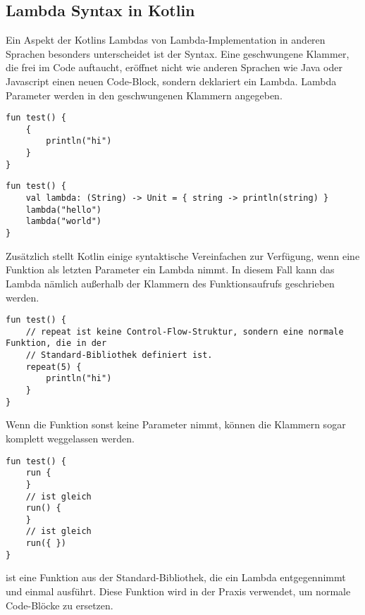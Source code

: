 \subsection{Lambda Syntax in Kotlin}
Ein Aspekt der Kotlins Lambdas von Lambda-Implementation in anderen Sprachen besonders unterscheidet ist der Syntax.
Eine geschwungene Klammer, die frei im Code auftaucht, eröffnet nicht wie anderen Sprachen wie \zB Java oder Javascript
einen neuen Code-Block, sondern deklariert ein Lambda.
Lambda Parameter werden in den geschwungenen Klammern angegeben.\cite{kspecLambdaLiteral}

\begin{verbatim}
fun test() {
    {
        println("hi")
    }
}
\end{verbatim}

\begin{verbatim}
fun test() {
    val lambda: (String) -> Unit = { string -> println(string) }
    lambda("hello")
    lambda("world")
}
\end{verbatim}

Zusätzlich stellt Kotlin einige syntaktische Vereinfachen zur Verfügung, wenn eine Funktion als letzten Parameter
ein Lambda nimmt.
In diesem Fall kann das Lambda nämlich außerhalb der Klammern des Funktionsaufrufs geschrieben werden.

\begin{verbatim}
fun test() {
    // repeat ist keine Control-Flow-Struktur, sondern eine normale Funktion, die in der
    // Standard-Bibliothek definiert ist.
    repeat(5) {
        println("hi")
    }
}
\end{verbatim}

Wenn die Funktion sonst keine Parameter nimmt, können die Klammern sogar komplett weggelassen werden.

\begin{verbatim}
fun test() {
    run {
    }
    // ist gleich
    run() {
    }
    // ist gleich
    run({ })
}
\end{verbatim}

 ist eine Funktion aus der Standard-Bibliothek, die ein Lambda entgegennimmt und einmal ausführt.
Diese Funktion wird in der Praxis verwendet, um normale Code-Blöcke zu ersetzen.

